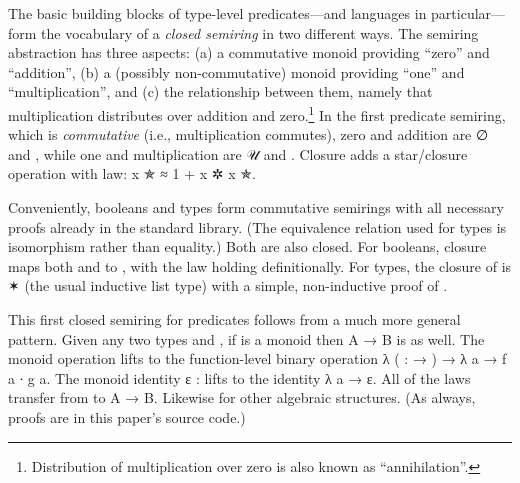 \documentclass[acmsmall,screen,anonymous,timestamp]{acmart}
\begin{document}


The basic building blocks of type-level predicates---and languages in particular---form the vocabulary of a \emph{closed semiring} in two different ways.
The semiring abstraction has three aspects: (a) a commutative monoid providing ``zero'' and ``addition'', (b) a (possibly non-commutative) monoid providing ``one'' and ``multiplication'', and (c) the relationship between them, namely that multiplication distributes over addition and zero.\footnote{Distribution of multiplication over zero is also known as ``annihilation''.}
In the first predicate semiring, which is \emph{commutative} (i.e., multiplication commutes), zero and addition are \AF ∅ and , while one and multiplication are \AF 𝒰 and .
Closure adds a star/closure operation  with  law: {\AB x \AF ✯ \AF ≈ 1 \AF + \AB x \AF ✲ \AB x \AF ✯}.

Conveniently, booleans and types form commutative semirings with all necessary proofs already in the standard library.
(The equivalence relation used for types is isomorphism rather than equality.)
Both are also closed.
For booleans, closure maps both  and  to , with the  law holding definitionally.
For types, the closure of  is { ✶} (the usual inductive list type) with a simple, non-inductive proof of .

This first closed semiring for predicates follows from a much more general pattern.
Given any two types  and , if  is a monoid then {\AB A \AS → \AB B} is as well.
The monoid operation  lifts to the function-level binary operation {\AS λ (  :  \AS → ) \AS → \AS λ \AB a \AS → \AB f \AB a \AB ∙ \AB g \AB a}.
The monoid identity {\AB ε \AS : } lifts to the identity {\AS λ \AB a \AS → \AB ε}.
All of the laws transfer from  to {\AB A \AS → \AB B}.
Likewise for other algebraic structures.
(As always, proofs are in this paper's source code.)
\end{document}
